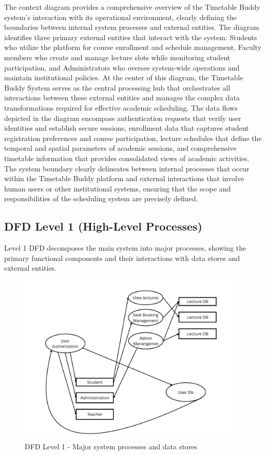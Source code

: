The context diagram provides a comprehensive overview of the Timetable Buddy system's interaction with its operational environment, clearly defining the boundaries between internal system processes and external entities. The diagram identifies three primary external entities that interact with the system: Students who utilize the platform for course enrollment and schedule management, Faculty members who create and manage lecture slots while monitoring student participation, and Administrators who oversee system-wide operations and maintain institutional policies. At the center of this diagram, the Timetable Buddy System serves as the central processing hub that orchestrates all interactions between these external entities and manages the complex data transformations required for effective academic scheduling. The data flows depicted in the diagram encompass authentication requests that verify user identities and establish secure sessions, enrollment data that captures student registration preferences and course participation, lecture schedules that define the temporal and spatial parameters of academic sessions, and comprehensive timetable information that provides consolidated views of academic activities. The system boundary clearly delineates between internal processes that occur within the Timetable Buddy platform and external interactions that involve human users or other institutional systems, ensuring that the scope and responsibilities of the scheduling system are precisely defined.

\subsection{DFD Level 1 (High-Level Processes)}

Level 1 DFD decomposes the main system into major processes, showing the primary functional components and their interactions with data stores and external entities.

\begin{figure}[htbp]
    \centering
    \includegraphics[width=0.95\textwidth]{images/DFD Level 1.png}
    \caption{DFD Level 1 - Major system processes and data stores}
    \label{fig:dfd1}
\end{figure}

